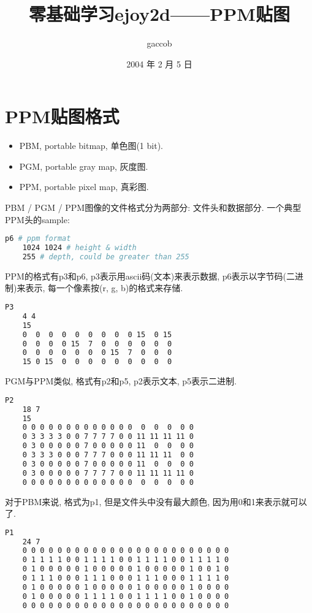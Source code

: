 

\title {\ZHH \huge 零基础学习ejoy2d——PPM贴图}
\author {\small gaccob}
\date {\small 2004 年 2 月 5 日}
\maketitle

\section {\ZHH PPM贴图格式} {
    \begin {itemize}
    \item {PBM, portable bitmap, 单色图(1 bit). }
    \item {PGM, portable gray map, 灰度图. }
    \item {PPM, portable pixel map, 真彩图. }
    \end {itemize}\par

    {PBM / PGM / PPM图像的文件格式分为两部分: 文件头和数据部分. 一个典型PPM头的sample: }\par
    \begin{lstlisting}[language=bash]
    p6 # ppm format
    1024 1024 # height & width
    255 # depth, could be greater than 255
    \end{lstlisting}

    {PPM的格式有p3和p6, p3表示用ascii码(文本)来表示数据, p6表示以字节码(二进制)来表示, 每一个像素按(r, g, b)的格式来存储. }\par
    \begin{lstlisting}[language=bash]
    P3
    4 4
    15
    0  0  0  0  0  0  0  0  0 15  0 15
    0  0  0  0 15  7  0  0  0  0  0  0
    0  0  0  0  0  0  0 15  7  0  0  0
    15 0 15  0  0  0  0  0  0  0  0  0
    \end{lstlisting}

    {PGM与PPM类似, 格式有p2和p5, p2表示文本, p5表示二进制.}\par
    \begin{lstlisting}[language=bash]
    P2
    18 7
    15
    0 0 0 0 0 0 0 0 0 0 0 0 0  0  0  0  0 0
    0 3 3 3 3 0 0 7 7 7 7 0 0 11 11 11 11 0
    0 3 0 0 0 0 0 7 0 0 0 0 0 11  0  0  0 0
    0 3 3 3 0 0 0 7 7 7 0 0 0 11 11 11  0 0
    0 3 0 0 0 0 0 7 0 0 0 0 0 11  0  0  0 0
    0 3 0 0 0 0 0 7 7 7 7 0 0 11 11 11 11 0
    0 0 0 0 0 0 0 0 0 0 0 0 0  0  0  0  0 0
    \end{lstlisting}

    {对于PBM来说, 格式为p1, 但是文件头中没有最大颜色, 因为用0和1来表示就可以了.}\par
    \begin{lstlisting}[language=bash]
    P1
    24 7
    0 0 0 0 0 0 0 0 0 0 0 0 0 0 0 0 0 0 0 0 0 0 0 0
    0 1 1 1 1 0 0 1 1 1 1 0 0 1 1 1 1 0 0 1 1 1 1 0
    0 1 0 0 0 0 0 1 0 0 0 0 0 1 0 0 0 0 0 1 0 0 1 0
    0 1 1 1 0 0 0 1 1 1 0 0 0 1 1 1 0 0 0 1 1 1 1 0
    0 1 0 0 0 0 0 1 0 0 0 0 0 1 0 0 0 0 0 1 0 0 0 0
    0 1 0 0 0 0 0 1 1 1 1 0 0 1 1 1 1 0 0 1 0 0 0 0
    0 0 0 0 0 0 0 0 0 0 0 0 0 0 0 0 0 0 0 0 0 0 0 0
    \end{lstlisting}

}
